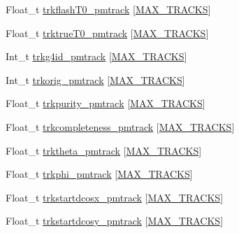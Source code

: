 \begin{DoxyCompactItemize}
Float\-\_\-t \hyperlink{classanatree_adb2e61caf54e6fc678b1869ee2226512}{trkflash\-T0\-\_\-pmtrack} \mbox{[}\hyperlink{anatree__core__v09410002_8h_a327fd4e796e4a0d78947524c96e4362e}{M\-A\-X\-\_\-\-T\-R\-A\-C\-K\-S}\mbox{]}
\item 
Float\-\_\-t \hyperlink{classanatree_ac1e686b8606161c5b72b189552df5b2a}{trktrue\-T0\-\_\-pmtrack} \mbox{[}\hyperlink{anatree__core__v09410002_8h_a327fd4e796e4a0d78947524c96e4362e}{M\-A\-X\-\_\-\-T\-R\-A\-C\-K\-S}\mbox{]}
\item 
Int\-\_\-t \hyperlink{classanatree_a389a142b574ea74f61e2247ff9ea9806}{trkg4id\-\_\-pmtrack} \mbox{[}\hyperlink{anatree__core__v09410002_8h_a327fd4e796e4a0d78947524c96e4362e}{M\-A\-X\-\_\-\-T\-R\-A\-C\-K\-S}\mbox{]}
\item 
Int\-\_\-t \hyperlink{classanatree_a40b2e25b21a569c112d0515d4d4fbc85}{trkorig\-\_\-pmtrack} \mbox{[}\hyperlink{anatree__core__v09410002_8h_a327fd4e796e4a0d78947524c96e4362e}{M\-A\-X\-\_\-\-T\-R\-A\-C\-K\-S}\mbox{]}
\item 
Float\-\_\-t \hyperlink{classanatree_a7c787dca7ecc8e5dc25a09f4b84cc6ed}{trkpurity\-\_\-pmtrack} \mbox{[}\hyperlink{anatree__core__v09410002_8h_a327fd4e796e4a0d78947524c96e4362e}{M\-A\-X\-\_\-\-T\-R\-A\-C\-K\-S}\mbox{]}
\item 
Float\-\_\-t \hyperlink{classanatree_a904eca4d622f71d436025a3783d9a780}{trkcompleteness\-\_\-pmtrack} \mbox{[}\hyperlink{anatree__core__v09410002_8h_a327fd4e796e4a0d78947524c96e4362e}{M\-A\-X\-\_\-\-T\-R\-A\-C\-K\-S}\mbox{]}
\item 
Float\-\_\-t \hyperlink{classanatree_a76982f5992329f79813fa15ea620fb03}{trktheta\-\_\-pmtrack} \mbox{[}\hyperlink{anatree__core__v09410002_8h_a327fd4e796e4a0d78947524c96e4362e}{M\-A\-X\-\_\-\-T\-R\-A\-C\-K\-S}\mbox{]}
\item 
Float\-\_\-t \hyperlink{classanatree_a00019f5a4bc26a4853595fafa2964cc7}{trkphi\-\_\-pmtrack} \mbox{[}\hyperlink{anatree__core__v09410002_8h_a327fd4e796e4a0d78947524c96e4362e}{M\-A\-X\-\_\-\-T\-R\-A\-C\-K\-S}\mbox{]}
\item 
Float\-\_\-t \hyperlink{classanatree_a947165a91b8bda0981d75d230094e253}{trkstartdcosx\-\_\-pmtrack} \mbox{[}\hyperlink{anatree__core__v09410002_8h_a327fd4e796e4a0d78947524c96e4362e}{M\-A\-X\-\_\-\-T\-R\-A\-C\-K\-S}\mbox{]}
\item 
Float\-\_\-t \hyperlink{classanatree_aa6a223461862a75581054d6c5e139a17}{trkstartdcosy\-\_\-pmtrack} \mbox{[}\hyperlink{anatree__core__v09410002_8h_a327fd4e796e4a0d78947524c96e4362e}{M\-A\-X\-\_\-\-T\-R\-A\-C\-K\-S}\mbox{]}

\end{DoxyCompactItemize}
